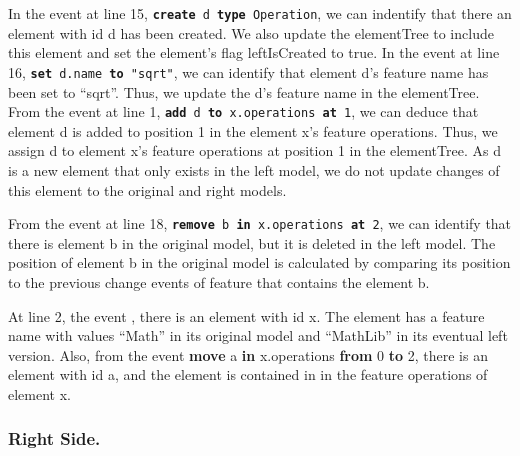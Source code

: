 \documentclass{llncs}
\begin{document}
In the event at line 15, \texttt{\small \textbf{create} d \textbf{type} Operation}, we can indentify that there an element with id \textsf{d} has been created. We also update the \textsf{elementTree} to include this element and set the element's flag \textsf{leftIsCreated} to \textsf{true}. In the event at line 16, \texttt{\small \textbf{set} d.name \textbf{to} "sqrt"}, we can identify that element \textsf{d}'s feature \textsf{name} has been set to ``sqrt''. Thus, we update the \textsf{d}'s feature \textsf{name} in the \textsf{elementTree}. From the event at line 1, \texttt{\small \textbf{add} d \textbf{to} x.operations \textbf{at} 1}, we can deduce that element \textsf{d} is added to position 1 in the element \textsf{x}'s feature \textsf{operations}. Thus, we assign \textsf{d} to element \textsf{x}'s feature \textsf{operations} at position 1 in the \textsf{elementTree}. As \textsf{d} is a new element that only exists in the left model, we do not update changes of this element to the original and right models. 

From the event at line 18, \texttt{\small \textbf{remove} b \textbf{in} x.operations \textbf{at} 2}, we can identify that there is element \textsf{b} in the original model, but it is deleted in the left model. The position of element \textsf{b} in the original model is calculated by comparing its position to the previous change events of feature that contains the element \textsf{b}.  



At line 2, the event  , there is an element with id \textsf{x}. The element has a feature \textsf{name} with values ``Math'' in its original model and ``MathLib'' in its eventual left version. Also, from the event \textsf{\small \textbf{move} a \textbf{in} x.operations \textbf{from} 0 \textbf{to} 2}, there is an element with id \textsf{a}, and the element is contained in in the feature \textsf{operations} of element \textsf{x}. 




\subsubsection{Right Side.} 
\label{sec:right_side}
\end{document}
